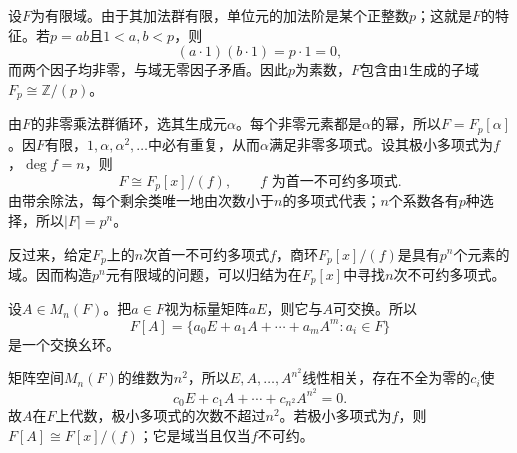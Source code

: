 \begin{example}
设$F$为有限域。由于其加法群有限，单位元的加法阶是某个正整数$p$；这就是$F$的特征。若$p=ab$且$1<a,b<p$，则
\[
(a\cdot1)(b\cdot1)=p\cdot1=0,
\]
而两个因子均非零，与域无零因子矛盾。因此$p$为素数，$F$包含由$1$生成的子域$F_p\cong\mathbb Z/(p)$。

由$F$的非零乘法群循环，选其生成元$\alpha$。每个非零元素都是$\alpha$的幂，所以$F=F_p[\alpha]$。因$F$有限，$1,\alpha,\alpha^2,\ldots$中必有重复，从而$\alpha$满足非零多项式。设其极小多项式为$f$，$\deg f=n$，则
\[
F\cong F_p[x]/(f),\qquad f\text{ 为首一不可约多项式}.
\]
由带余除法，每个剩余类唯一地由次数小于$n$的多项式代表；$n$个系数各有$p$种选择，所以$|F|=p^n$。

反过来，给定$F_p$上的$n$次首一不可约多项式$f$，商环$F_p[x]/(f)$是具有$p^n$个元素的域。因而构造$p^n$元有限域的问题，可以归结为在$F_p[x]$中寻找$n$次不可约多项式。
\end{example}

\begin{example}
设$A\in M_n(F)$。把$a\in F$视为标量矩阵$aE$，则它与$A$可交换。所以
\[
F[A]=\{a_0E+a_1A+\cdots+a_mA^m:a_i\in F\}
\]
是一个交换幺环。

矩阵空间$M_n(F)$的维数为$n^2$，所以$E,A,\ldots,A^{n^2}$线性相关，存在不全为零的$c_i$使
\[
c_0E+c_1A+\cdots+c_{n^2}A^{n^2}=0.
\]
故$A$在$F$上代数，极小多项式的次数不超过$n^2$。若极小多项式为$f$，则$F[A]\cong F[x]/(f)$；它是域当且仅当$f$不可约。
\end{example}

